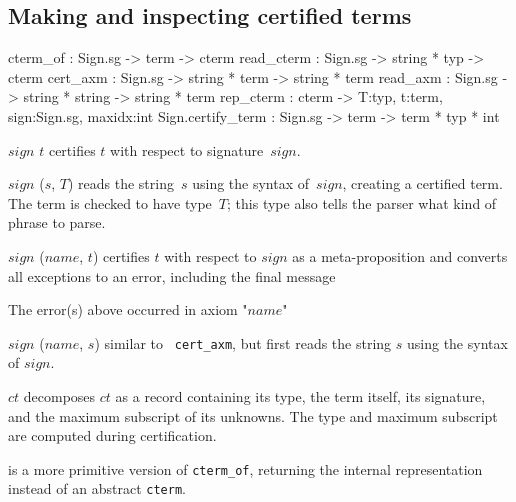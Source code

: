 \subsection{Making and inspecting certified terms}
\begin{ttbox}
cterm_of          : Sign.sg -> term -> cterm
read_cterm        : Sign.sg -> string * typ -> cterm
cert_axm          : Sign.sg -> string * term -> string * term
read_axm          : Sign.sg -> string * string -> string * term
rep_cterm         : cterm -> {\ttlbrace}T:typ, t:term, sign:Sign.sg, maxidx:int\ttrbrace
Sign.certify_term : Sign.sg -> term -> term * typ * int
\end{ttbox}
\begin{ttdescription}
  
\item[\ttindexbold{cterm_of} $sign$ $t$]  certifies
  $t$ with respect to signature~$sign$.
  
\item[\ttindexbold{read_cterm} $sign$ ($s$, $T$)] reads the string~$s$
  using the syntax of~$sign$, creating a certified term.  The term is
  checked to have type~$T$; this type also tells the parser what kind
  of phrase to parse.
  
\item[\ttindexbold{cert_axm} $sign$ ($name$, $t$)] certifies $t$ with
  respect to $sign$ as a meta-proposition and converts all exceptions
  to an error, including the final message
\begin{ttbox}
The error(s) above occurred in axiom "\(name\)"
\end{ttbox}

\item[\ttindexbold{read_axm} $sign$ ($name$, $s$)] similar to {\tt
    cert_axm}, but first reads the string $s$ using the syntax of
  $sign$.
  
\item[\ttindexbold{rep_cterm} $ct$] decomposes $ct$ as a record
  containing its type, the term itself, its signature, and the maximum
  subscript of its unknowns.  The type and maximum subscript are
  computed during certification.
  
\item[\ttindexbold{Sign.certify_term}] is a more primitive version of
  \texttt{cterm_of}, returning the internal representation instead of
  an abstract \texttt{cterm}.

\end{ttdescription}


